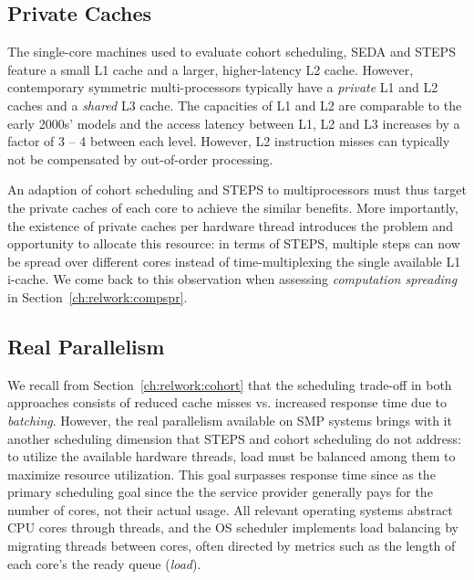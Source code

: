\documentclass[12pt,a4paper]{book}
\begin{document}
\subsection{Private Caches}
The single-core machines used to evaluate cohort scheduling, SEDA and STEPS feature a small L1 cache and a larger, higher-latency L2 cache.
However, contemporary symmetric multi-processors typically have a \emph{private} L1 and L2 caches and a \emph{shared} L3 cache.
The capacities of L1 and L2 are comparable to the early 2000s' models and the access latency between L1, L2 and L3 increases by a factor of 3 -- 4 between each level.
However, L2 instruction misses can typically not be compensated by out-of-order processing.~\cite{hennessy2002,haswellCacheLatency} %

An adaption of cohort scheduling and STEPS to multiprocessors must thus target the private caches of each core to achieve the similar benefits.
More importantly, the existence of private caches per hardware thread introduces the problem and opportunity to allocate this resource:
in terms of STEPS, multiple steps can now be spread over different cores instead of time-multiplexing the single available L1 i-cache.
We come back to this observation when assessing \emph{computation spreading} in Section~\ref{ch:relwork:compspr}.

\subsection{Real Parallelism}
We recall from Section~\ref{ch:relwork:cohort} that the scheduling trade-off in both approaches consists of reduced cache misses vs. increased response time due to \emph{batching}.
However, the real parallelism available on SMP systems brings with it another scheduling dimension that STEPS and cohort scheduling do not address:
to utilize the available hardware threads, load must be balanced among them to maximize resource utilization.
This goal surpasses response time since as the primary scheduling goal since the the service provider generally pays for the number of cores, not their actual usage.
All relevant operating systems abstract CPU cores through threads, and the OS scheduler implements load balancing by migrating threads between cores, often directed by metrics such as the length of each core's the ready queue (\emph{load}).~\cite{freeBSDSchedulerLoad}
\end{document}
